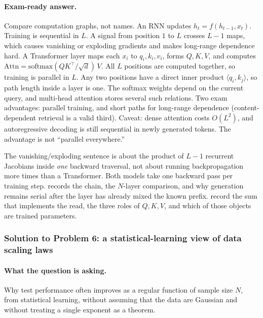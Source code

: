 \documentclass[11pt,a4paper]{article}
\theoremstyle{definition}
\begin{document}
\paragraph{Exam-ready answer.}
Compare computation graphs, not names. An RNN updates \(h_t=f(h_{t-1},x_t)\). Training is sequential in \(L\). A signal from position \(1\) to \(L\) crosses \(L-1\) maps, which causes vanishing or exploding gradients and makes long-range dependence hard. A Transformer layer maps each \(x_i\) to \(q_i,k_i,v_i\), forms \(Q,K,V\), and computes \(\mathrm{Attn}=\mathrm{softmax}(QK^\top/\sqrt{d})\,V\). All \(L\) positions are computed together, so training is parallel in \(L\). Any two positions have a direct inner product \(\langle q_i,k_j\rangle\), so path length inside a layer is one. The softmax weights depend on the current query, and multi-head attention stores several such relations. Two exam advantages: parallel training, and short paths for long-range dependence (content-dependent retrieval is a valid third). Caveat: dense attention costs \(O(L^2)\), and autoregressive decoding is still sequential in newly generated tokens. The advantage is not ``parallel everywhere.''

\begin{note}\label{note:spr2025-nlp-p5-bwd}
The vanishing/exploding sentence is about the product of \(L-1\) recurrent Jacobians inside \emph{one} backward traversal, not about running backpropagation more times than a Transformer. Both models take one backward pass per training step.  records the chain, the \(N\)-layer comparison, and why generation remains serial after the layer has already mixed the known prefix.  record the sum that implements the read, the three roles of \(Q,K,V\), and which of those objects are trained parameters.
\end{note}

\subsubsection{Solution to Problem 6: a statistical-learning view of data scaling laws}

\paragraph{What the question is asking.}
Why test performance often improves as a regular function of sample size \(N\), from statistical learning, without assuming that the data are Gaussian and without treating a single exponent as a theorem.
\end{document}
